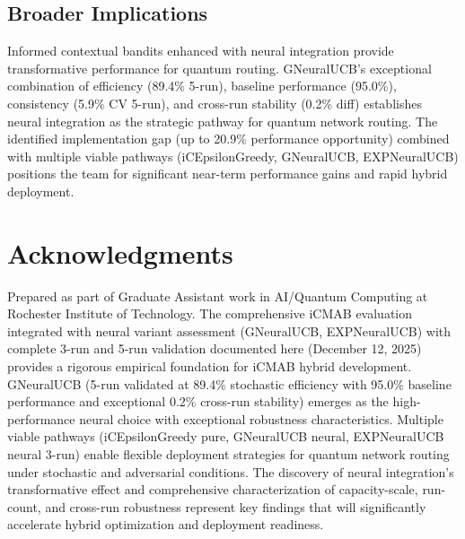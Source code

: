 \documentclass[12pt,a4paper]{article}
\begin{document}
\subsection{Broader Implications}

Informed contextual bandits enhanced with neural integration provide transformative performance for quantum routing. GNeuralUCB's exceptional combination of efficiency (89.4\% 5-run), baseline performance (95.0\%), consistency (5.9\% CV 5-run), and cross-run stability (0.2\% diff) establishes neural integration as the strategic pathway for quantum network routing. The identified implementation gap (up to 20.9\% performance opportunity) combined with multiple viable pathways (iCEpsilonGreedy, GNeuralUCB, EXPNeuralUCB) positions the team for significant near-term performance gains and rapid hybrid deployment.

\newpage
\section{Acknowledgments}

Prepared as part of Graduate Assistant work in AI/Quantum Computing at Rochester Institute of Technology. The comprehensive iCMAB evaluation integrated with neural variant assessment (GNeuralUCB, EXPNeuralUCB) with complete 3-run and 5-run validation documented here (December 12, 2025) provides a rigorous empirical foundation for iCMAB hybrid development. GNeuralUCB (5-run validated at 89.4\% stochastic efficiency with 95.0\% baseline performance and exceptional 0.2\% cross-run stability) emerges as the high-performance neural choice with exceptional robustness characteristics. Multiple viable pathways (iCEpsilonGreedy pure, GNeuralUCB neural, EXPNeuralUCB neural 3-run) enable flexible deployment strategies for quantum network routing under stochastic and adversarial conditions. The discovery of neural integration's transformative effect and comprehensive characterization of capacity-scale, run-count, and cross-run robustness represent key findings that will significantly accelerate hybrid optimization and deployment readiness.
\end{document}
